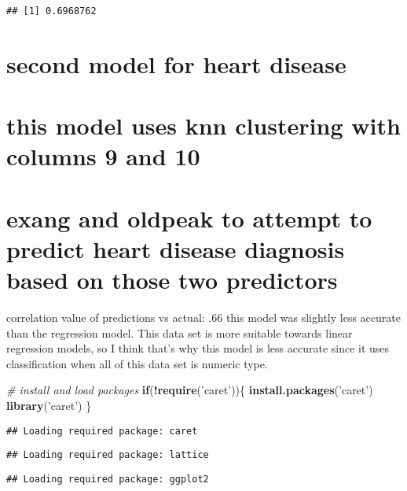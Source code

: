 \documentclass[]{article}
\newenvironment{Shaded}{\begin{snugshade}}{\end{snugshade}}
\newcommand{\KeywordTok}[1]{\textcolor[rgb]{0.13,0.29,0.53}{\textbf{#1}}}
\newcommand{\StringTok}[1]{\textcolor[rgb]{0.31,0.60,0.02}{#1}}
\newcommand{\CommentTok}[1]{\textcolor[rgb]{0.56,0.35,0.01}{\textit{#1}}}
\newcommand{\ControlFlowTok}[1]{\textcolor[rgb]{0.13,0.29,0.53}{\textbf{#1}}}
\newcommand{\OperatorTok}[1]{\textcolor[rgb]{0.81,0.36,0.00}{\textbf{#1}}}
\newcommand{\NormalTok}[1]{#1}
\begin{document}
\begin{verbatim}
## [1] 0.6968762
\end{verbatim}

\section{second model for heart
disease}\label{second-model-for-heart-disease}

\section{this model uses knn clustering with columns 9 and
10}\label{this-model-uses-knn-clustering-with-columns-9-and-10}

\section{exang and oldpeak to attempt to predict heart disease diagnosis
based on those two
predictors}\label{exang-and-oldpeak-to-attempt-to-predict-heart-disease-diagnosis-based-on-those-two-predictors}

correlation value of predictions vs actual: .66 this model was slightly
less accurate than the regression model. This data set is more suitable
towards linear regression models, so I think that's why this model is
less accurate since it uses classification when all of this data set is
numeric type.

\begin{Shaded}
\begin{Highlighting}[]
\CommentTok{# install and load packages}
\ControlFlowTok{if}\NormalTok{(}\OperatorTok{!}\KeywordTok{require}\NormalTok{(}\StringTok{'caret'}\NormalTok{))\{}
  \KeywordTok{install.packages}\NormalTok{(}\StringTok{'caret'}\NormalTok{)  }
  \KeywordTok{library}\NormalTok{(}\StringTok{'caret'}\NormalTok{)}
\NormalTok{\}}
\end{Highlighting}
\end{Shaded}

\begin{verbatim}
## Loading required package: caret
\end{verbatim}

\begin{verbatim}
## Loading required package: lattice
\end{verbatim}

\begin{verbatim}
## Loading required package: ggplot2
\end{verbatim}
\end{document}
